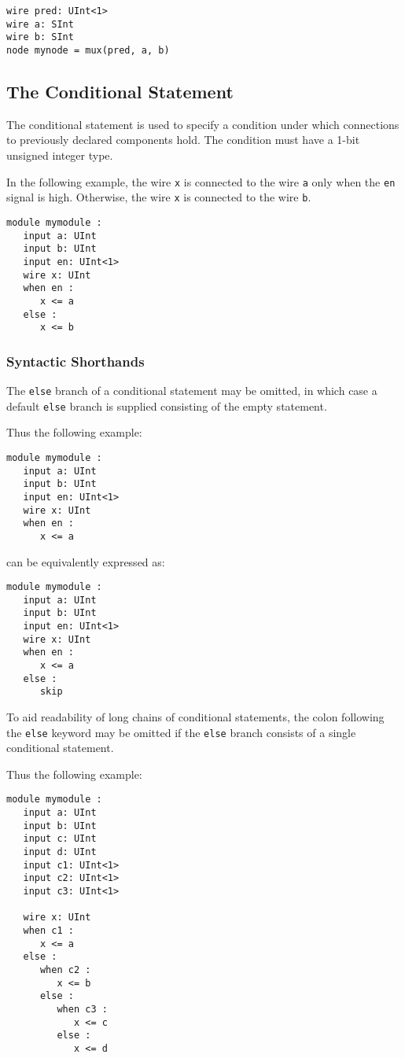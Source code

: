 \documentclass[12pt]{article}
\begin{document}
\begin{verbatim}
wire pred: UInt<1>
wire a: SInt
wire b: SInt
node mynode = mux(pred, a, b)
\end{verbatim}

\subsection{The Conditional Statement}
The conditional statement is used to specify a condition under which connections to previously declared components hold. The condition must have a 1-bit unsigned integer type.

In the following example, the wire \verb|x| is connected to the wire \verb|a| only when the \verb|en| signal is high. Otherwise, the wire \verb|x| is connected to the wire \verb|b|. 

\begin{verbatim}
module mymodule :
   input a: UInt
   input b: UInt
   input en: UInt<1>
   wire x: UInt
   when en :
      x <= a
   else :
      x <= b  
\end{verbatim}

\subsubsection{Syntactic Shorthands}
The \verb|else| branch of a conditional statement may be omitted, in which case a default \verb|else| branch is supplied consisting of the empty statement.

Thus the following example:

\begin{verbatim}
module mymodule :
   input a: UInt
   input b: UInt
   input en: UInt<1>
   wire x: UInt
   when en :
      x <= a
\end{verbatim}

can be equivalently expressed as:

\begin{verbatim}
module mymodule :
   input a: UInt
   input b: UInt
   input en: UInt<1>
   wire x: UInt
   when en :
      x <= a
   else : 
      skip   
\end{verbatim}

To aid readability of long chains of conditional statements, the colon following the \verb|else| keyword may be omitted if the \verb|else| branch consists of a single conditional statement.

Thus the following example:

\begin{verbatim}
module mymodule :
   input a: UInt
   input b: UInt
   input c: UInt
   input d: UInt
   input c1: UInt<1>
   input c2: UInt<1>
   input c3: UInt<1>

   wire x: UInt
   when c1 :
      x <= a
   else :
      when c2 :
         x <= b
      else :
         when c3 :
            x <= c  
         else :
            x <= d       
\end{verbatim}
\end{document}
